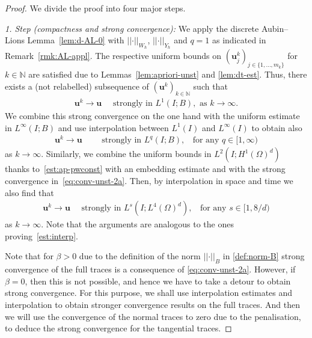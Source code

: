 \documentclass[reqno,a4paper]{amsart}
\def\norm#1{\left|\!\left| #1 \right|\!\right|}
\def\vec#1{\boldsymbol{#1}}
\def\bu{\vec{u}}
\begin{document}
%
\begin{proof}
	We divide the proof into four major steps. 
	
	\textit{1. Step (compactness and strong convergence):}
	We apply the discrete Aubin--Lions Lemma~\ref{lem:d-AL-0} with $\norm{\cdot}_{W_h}$, $\norm{\cdot}_{Y_h}$ and $q = 1$ { as indicated in Remark~\ref{rmk:AL-appl}.}
	The respective uniform bounds on $( \bu^k_j)_{j \in \{1, \ldots, m_k\}}$ for $k \in \mathbb{N}$ are satisfied due to  Lemmas~\ref{lem:apriori-unst} and \ref{lem:dt-est}. 
	Thus, there exists a (not relabelled) subsequence of $( \bu^k)_{k \in \mathbb{N}}$ such that 
	\begin{align}\label{eq:conv-unst-1}
		\bu^k \to  \bu \quad \text{ strongly in } L^1(I;B), \text{ as } k \to \infty.
	\end{align}
	We combine this strong convergence on the one hand with the uniform estimate in $L^\infty(I;B)$  and use interpolation between $L^1(I)$ and $L^\infty(I)$ to obtain also 
		\begin{align}
			\label{eq:conv-unst-2a}
			\bu^k \to  \bu \qquad \text{ strongly in } L^q(I;B),  \;\;\text{ for any } q \in [1,\infty)
		\end{align}
		as $k \to \infty$.
		Similarly, we combine the uniform bounds in $L^{2}(I;H^1(\Omega)^d)$ thanks to~\eqref{est:ap-pwconst} with an embedding estimate and with the strong convergence in~\eqref{eq:conv-unst-2a}. 
		Then, by interpolation in space and time we also find that 					
  \begin{align}
			\label{eq:conv-unst-2b}
			\bu^k \to \bu \quad \text{ strongly in } L^s(I;L^4(\Omega)^d), 
			\;\; \text{ for any } s \in [1,8/d)
		\end{align}
		as $k \to \infty$. Note that the arguments are analogous to the ones proving~\ref{est:interp}. 
	
	Note that for $\beta >0 $ due to the definition of the norm $\norm{\cdot}_B$ in \eqref{def:norm-B} strong convergence of the full traces is a consequence of \eqref{eq:conv-unst-2a}. 
		However, if $\beta = 0$, then this is not possible, and hence we have to take a detour to obtain strong convergence. 
		For this purpose, we shall use interpolation estimates and interpolation to obtain stronger convergence results on the full traces. And then we will use the convergence of the normal traces to zero due to the penalisation, to deduce the strong convergence for the tangential traces. 
	

\end{proof}
\end{document}
